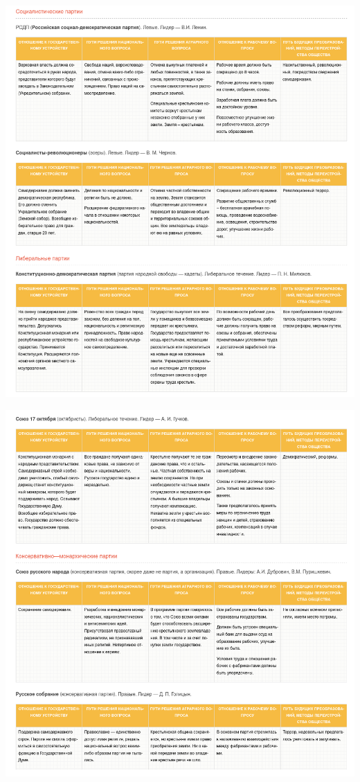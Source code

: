 \documentclass{article}
\begin{document}
\includegraphics[width=\textwidth]{parties_01}

\pagebreak

\includegraphics[width=\textwidth]{parties_02}
\end{document}
